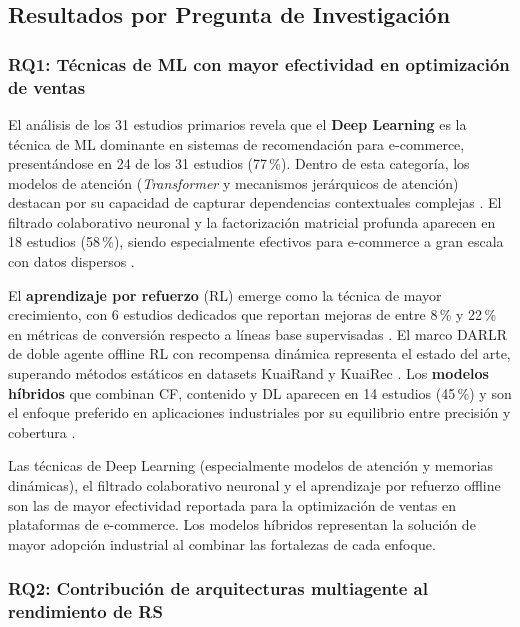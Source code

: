 \documentclass[12pt, a4paper]{article}
\begin{document}
\subsection{Resultados por Pregunta de Investigaci\'on}

\subsubsection{RQ1: T\'ecnicas de ML con mayor efectividad en optimizaci\'on de ventas}

El an\'alisis de los 31 estudios primarios revela que el \textbf{Deep Learning}
es la t\'ecnica de ML dominante en sistemas de recomendaci\'on para e-commerce,
present\'andose en 24 de los 31 estudios (77\,\%). Dentro de esta categor\'ia,
los modelos de atenci\'on (\textit{Transformer} y mecanismos jer\'arquicos de
atenci\'on) destacan por su capacidad de capturar dependencias contextuales
complejas \cite{Ding2025, Ho2025GraphMind}. El filtrado colaborativo neuronal
y la factorizaci\'on matricial profunda aparecen en 18 estudios (58\,\%), siendo
especialmente efectivos para e-commerce a gran escala con datos dispersos
\cite{Alam2025, Girish2025, LiYuetong2025}.

El \textbf{aprendizaje por refuerzo} (RL) emerge como la t\'ecnica de mayor
crecimiento, con 6 estudios dedicados que reportan mejoras de entre 8\,\% y
22\,\% en m\'etricas de conversi\'on respecto a l\'ineas base supervisadas
\cite{Zhang2025DARLR, Zhang2023RL}. El marco DARLR de doble agente offline RL
con recompensa din\'amica representa el estado del arte, superando m\'etodos
est\'aticos en datasets KuaiRand y KuaiRec \cite{Zhang2025DARLR}. Los
\textbf{modelos h\'ibridos} que combinan CF, contenido y DL aparecen en 14
estudios (45\,\%) y son el enfoque preferido en aplicaciones industriales por
su equilibrio entre precisi\'on y cobertura \cite{Gupta2024, Lu2025, Girish2025}.

\begin{hallazgo}[]
  Las t\'ecnicas de Deep Learning (especialmente modelos de atenci\'on y
  memorias din\'amicas), el filtrado colaborativo neuronal y el aprendizaje por
  refuerzo offline son las de mayor efectividad reportada para la optimizaci\'on
  de ventas en plataformas de e-commerce. Los modelos h\'ibridos representan la
  soluci\'on de mayor adopci\'on industrial al combinar las fortalezas de cada
  enfoque.
\end{hallazgo}

\subsubsection{RQ2: Contribuci\'on de arquitecturas multiagente al rendimiento de RS}
\end{document}
